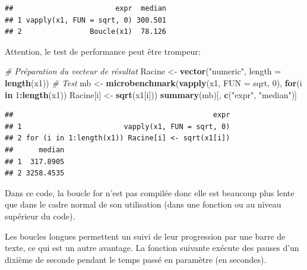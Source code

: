 \documentclass[
  12pt,
  french,
  a4paper,
  extrafontsizes,onecolumn,openright
  ]{memoir}
\newenvironment{Shaded}{\begin{snugshade}}{\end{snugshade}}
\newcommand{\CommentTok}[1]{\textcolor[rgb]{0.56,0.35,0.01}{\textit{#1}}}
\newcommand{\ControlFlowTok}[1]{\textcolor[rgb]{0.13,0.29,0.53}{\textbf{#1}}}
\newcommand{\DataTypeTok}[1]{\textcolor[rgb]{0.13,0.29,0.53}{#1}}
\newcommand{\DecValTok}[1]{\textcolor[rgb]{0.00,0.00,0.81}{#1}}
\newcommand{\KeywordTok}[1]{\textcolor[rgb]{0.13,0.29,0.53}{\textbf{#1}}}
\newcommand{\NormalTok}[1]{#1}
\newcommand{\OperatorTok}[1]{\textcolor[rgb]{0.81,0.36,0.00}{\textbf{#1}}}
\newcommand{\StringTok}[1]{\textcolor[rgb]{0.31,0.60,0.02}{#1}}
\newlength{\rf}
\begin{document}
\begin{verbatim}
##                        expr  median
## 1 vapply(x1, FUN = sqrt, 0) 300.501
## 2                Boucle(x1)  78.126
\end{verbatim}

\normalsize

Attention, le test de performance peut être trompeur:

\scriptsize

\begin{Shaded}
\begin{Highlighting}[]
\CommentTok{# Préparation du vecteur de résultat}
\NormalTok{Racine <-}\StringTok{ }\KeywordTok{vector}\NormalTok{(}\StringTok{"numeric"}\NormalTok{, }\DataTypeTok{length =} \KeywordTok{length}\NormalTok{(x1))}
\CommentTok{# Test}
\NormalTok{mb <-}\StringTok{ }\KeywordTok{microbenchmark}\NormalTok{(}\KeywordTok{vapply}\NormalTok{(x1, }\DataTypeTok{FUN =}\NormalTok{ sqrt, }\DecValTok{0}\NormalTok{), }
                     \ControlFlowTok{for}\NormalTok{(i }\ControlFlowTok{in} \DecValTok{1}\OperatorTok{:}\KeywordTok{length}\NormalTok{(x1)) }
\NormalTok{                       Racine[i] <-}\StringTok{ }\KeywordTok{sqrt}\NormalTok{(x1[i]))}
\KeywordTok{summary}\NormalTok{(mb)[, }\KeywordTok{c}\NormalTok{(}\StringTok{"expr"}\NormalTok{, }\StringTok{"median"}\NormalTok{)]}
\end{Highlighting}
\end{Shaded}

\begin{verbatim}
##                                               expr
## 1                        vapply(x1, FUN = sqrt, 0)
## 2 for (i in 1:length(x1)) Racine[i] <- sqrt(x1[i])
##      median
## 1  317.8905
## 2 3258.4535
\end{verbatim}

\normalsize

Dans ce code, la boucle for n'est pas compilée donc elle est beaucoup plus lente que dans le cadre normal de son utilisation (dans une fonction ou au niveau supérieur du code).

Les boucles longues permettent un suivi de leur progression par une barre de texte, ce qui est un autre avantage.
La fonction suivante exécute des pauses d'un dixième de seconde pendant le temps passé en paramètre (en secondes).

\scriptsize
\end{document}
